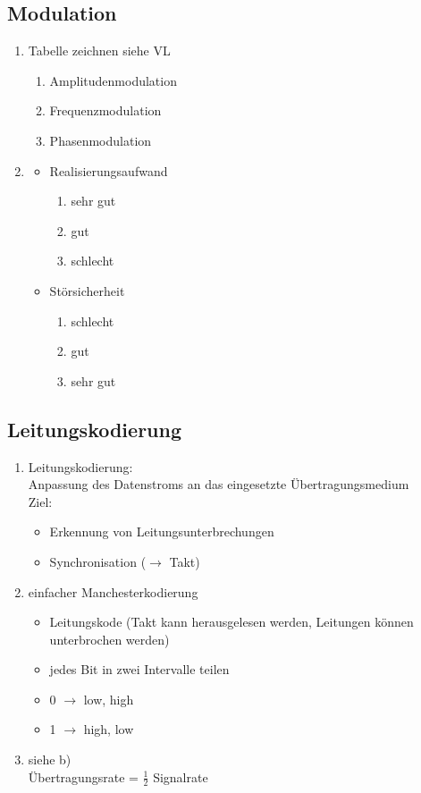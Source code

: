 \subsection{Modulation}
\begin{enumerate}
	\item Tabelle zeichnen siehe VL
	\begin{enumerate}
		\item Amplitudenmodulation
		\item Frequenzmodulation
		\item Phasenmodulation
	\end{enumerate}
	\item 
	\begin{itemize}
		\item Realisierungsaufwand
		\begin{enumerate}
			\item sehr gut
			\item gut
			\item schlecht
		\end{enumerate}
		\item Störsicherheit
		\begin{enumerate}
			\item schlecht
			\item gut
			\item sehr gut
		\end{enumerate}
	\end{itemize}
\end{enumerate}
\subsection{Leitungskodierung}
\begin{enumerate}
	\item Leitungskodierung: \\Anpassung des Datenstroms an das eingesetzte Übertragungsmedium \\ 
	Ziel:
	\begin{itemize}
		\item Erkennung von Leitungsunterbrechungen
		\item Synchronisation (\(\to\) Takt)
	\end{itemize}
	\item einfacher Manchesterkodierung
	\begin{itemize}
		\item Leitungskode (Takt kann herausgelesen werden, Leitungen können unterbrochen werden)
		\item jedes Bit in zwei Intervalle teilen
		\item 0 \(\to\) low, high
		\item 1 \(\to\) high, low
	\end{itemize}
	\item siehe b)\\
	Übertragungsrate = \(\frac{1}{2}\) Signalrate
\end{enumerate}
